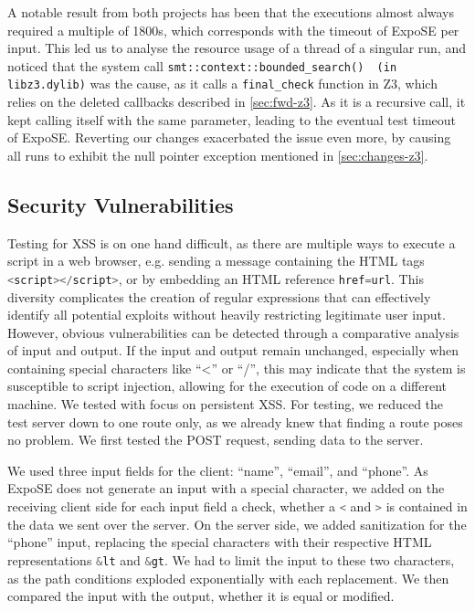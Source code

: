 \vspace{1cm}
A notable result from both projects has been that the executions almost always required a multiple of 1800s, which corresponds with the timeout of ExpoSE per input.
This led us to analyse the resource usage of a thread of a singular run, and noticed that the system call \lstinline{smt::context::bounded_search()  (in libz3.dylib)} was the cause, as it calls a \lstinline{final_check} function in Z3, which relies on the deleted callbacks described in \autoref{sec:fwd-z3}. As it is a recursive call, it kept calling itself with the same parameter, leading to the eventual test timeout of ExpoSE.  Reverting our changes exacerbated the issue even more, by causing all runs to exhibit the null pointer exception mentioned in \autoref{sec:changes-z3}.

\subsection{Security Vulnerabilities}
Testing for XSS is on one hand difficult, as there are multiple ways to execute a script in a web browser,
e.g. sending a message containing the HTML tags \lstinline[language=JavaScript]{<script></script>}, 
or by embedding an HTML reference \lstinline[language=JavaScript]{href=url}. 
This diversity complicates the creation of regular expressions that can effectively identify 
all potential exploits without heavily restricting legitimate user input.
However, obvious vulnerabilities can be detected through a comparative analysis of input and output.
If the input and output remain unchanged, especially when containing special characters like “\textless” or “/”, this may indicate that the system is susceptible to script injection, allowing for the execution of code on a different machine. 
We tested with focus on persistent XSS. For testing, we reduced the test server down to one route only, as we already knew that finding a route poses no problem. 
We first tested the \textsc{POST} request, sending data to the server.

We used three input fields for the client: “name”, “email”, and “phone”.
As ExpoSE does not generate an input with a special character, we added on the receiving client side for each input field a check, whether a \lstinline[language=JavaScript]{<} and \lstinline[language=JavaScript]{>} is contained in the data we sent over the server. On the server side, we added sanitization for the “phone” input, replacing the special characters with their respective HTML representations \lstinline[language=JavaScript]+&lt+
and \lstinline[language=JavaScript]+&gt+. We had to limit the input to these two characters, as the path conditions exploded exponentially with each replacement. We then compared the input with the output, whether it is equal or modified.

